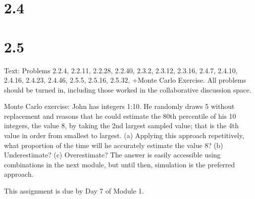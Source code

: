 \documentclass[11pt, oneside]{article}   	%
\begin{document}
\section{2.4}
\section{2.5}


Text: Problems 2.2.4, 2.2.11, 2.2.28, 2.2.40, 2.3.2, 2.3.12, 2.3.16, 2.4.7, 2.4.10, 2.4.16, 2.4.23, 2.4.46, 2.5.5, 2.5.16, 2.5.32, +Monte Carlo Exercise. All problems should be turned in, including those worked in the collaborative discussion space.

Monte Carlo exercise: John has integers 1:10. He randomly draws 5 without replacement and reasons that he could estimate the 80th percentile of his 10 integers, the value 8, by taking the 2nd largest sampled value; that is the 4th value in order from smallest to largest. (a) Applying this approach repetitively, what proportion of the time will he accurately estimate the value 8? (b) Underestimate? (c) Overestimate? The answer is easily accessible using combinations in the next module, but until then, simulation is the preferred approach.

This assignment is due by Day 7 of Module 1.
\end{document}
